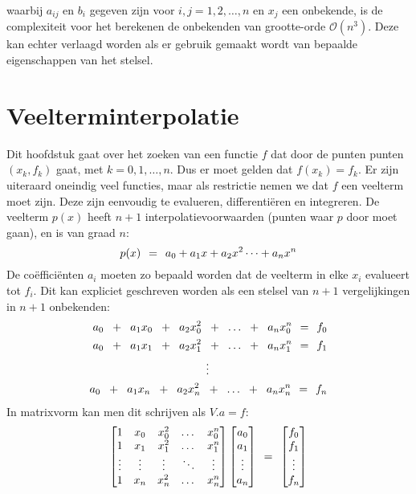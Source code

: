 \documentclass[11pt]{report}
\def \eq {\hspace{1.5mm}=\hspace{1.5mm}}
\def \h {\hspace{2mm}}
\begin{document}
	waarbij $a_{ij}$ en $b_i$ gegeven zijn voor $i, j = 1, 2, \dots, n$ en $x_j$ een onbekende, is de complexiteit voor het berekenen de onbekenden van grootte-orde $\mathcal{O}(n^3)$. Deze kan echter verlaagd worden als er gebruik gemaakt wordt van bepaalde eigenschappen van het stelsel.
	

\chapter{Veelterminterpolatie}
	Dit hoofdstuk gaat over het zoeken van een functie $f$ dat door de punten punten $(x_k, f_k)$ gaat, met $k = 0, 1, \dots, n$. Dus er moet gelden dat $f(x_k) = f_k$. Er zijn uiteraard oneindig veel functies, maar als restrictie nemen we dat $f$ een veelterm moet zijn. Deze zijn eenvoudig te evalueren, differenti\"{e}ren en integreren. De veelterm $p(x)$ heeft $n+1$ interpolatievoorwaarden (punten waar $p$ door moet gaan), en is van graad $n$:
	\begin{equation}\label{veelterm}
		p(x) \eq a_0 + a_1x + a_2x^2\dots + a_nx^n
	\end{equation}
	De co\"{e}ffici\"{e}nten $a_i$ moeten zo bepaald worden dat de veelterm in elke $x_i$ evalueert tot $f_i$. Dit kan expliciet geschreven worden als een stelsel van $n+1$ vergelijkingen in $n+1$ onbekenden:
	\begin{align*}
		a_0 \h+\h a_1x_0 \h+\h a_2x_0^2 \h+\h \dots \h+\h a_nx_0^n \eq f_0 \\
		a_0 \h+\h a_1x_1 \h+\h a_2x_1^2 \h+\h \dots \h+\h a_nx_1^n \eq f_1 \\
		\vdots\hspace{3.7cm}\\
		a_0 \h+\h a_1x_n \h+\h a_2x_n^2 \h+\h \dots \h+\h a_nx_n^n \eq f_n
	\end{align*}
	In matrixvorm kan men dit schrijven als $V.a = f$:
	\begin{equation*}
		\begin{bmatrix}
			1 & x_0 & x_0^2 & \dots & x_0^n\\
			1 & x_1 & x_1^2 & \dots & x_1^n\\
			\vdots & \vdots & \vdots & \ddots & \vdots \\
			1 & x_n & x_n^2 & \dots & x_n^n\\
		\end{bmatrix} 
		\begin{bmatrix}
			a_0 \\ a_1 \\ \vdots \\ a_n
		\end{bmatrix}
		\eq
		\begin{bmatrix}
			f_0 \\ f_1 \\ \vdots \\ f_n
		\end{bmatrix}
	\end{equation*}
	
\end{document}

